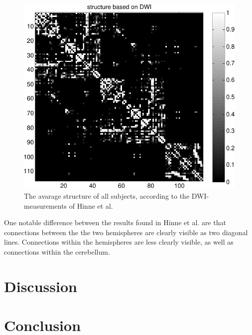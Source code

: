 \documentclass[a4paper, 10pt, english, onecolumn]{article}
\begin{document}
\begin{figure}[h!]
  \centering
  \includegraphics{images/structure_max}
  \caption{The avarage structure of all subjects, according to the DWI-measurements of Hinne et al.}
  \label{fig:struct_mean_max}
\end{figure}

One notable difference between the results found in Hinne et al. are that connections between the the two hemispheres are clearly visible as two diagonal lines. Connections within the hemispheres are less clearly visible, as well as connections within the cerebellum.


%

%

%

%


\section{Discussion}

\section{Conclusion}

{}

\end{document}
